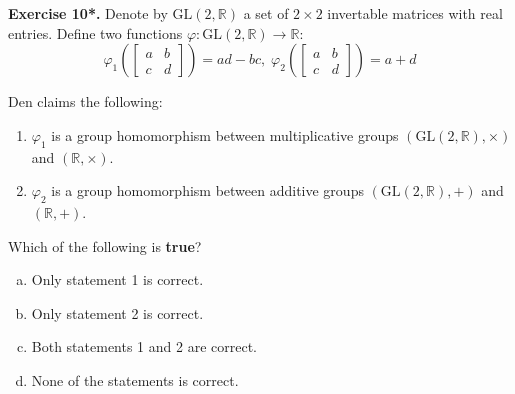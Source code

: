 \documentclass[../lecture-notes.tex]{subfiles}
\begin{document}
\textbf{Exercise 10*.} Denote by $\text{GL}(2,\mathbb{R})$ a set of $2\times 2$ invertable matrices with real entries. Define two functions $\varphi: \text{GL}(2,\mathbb{R}) \to \mathbb{R}$:
\begin{equation}
    \varphi_1 \left(\begin{bmatrix}
        a & b \\ c & d
    \end{bmatrix}\right) = ad - bc, \; \varphi_2 \left(\begin{bmatrix}
        a & b \\ c & d
    \end{bmatrix}\right) = a + d
\end{equation}

Den claims the following:
\begin{enumerate}
    \item $\varphi_1$ is a group homomorphism between multiplicative groups $(\text{GL}(2,\mathbb{R}), \times)$ and $(\mathbb{R}, \times)$.
    \item $\varphi_2$ is a group homomorphism between additive groups $(\text{GL}(2, \mathbb{R}), +)$ and $(\mathbb{R}, +)$.
\end{enumerate}

Which of the following is \textbf{true}?

\begin{enumerate}[a)]
    \item Only statement 1 is correct.
    \item Only statement 2 is correct.
    \item Both statements 1 and 2 are correct.
    \item None of the statements is correct.
\end{enumerate}
\end{document}
